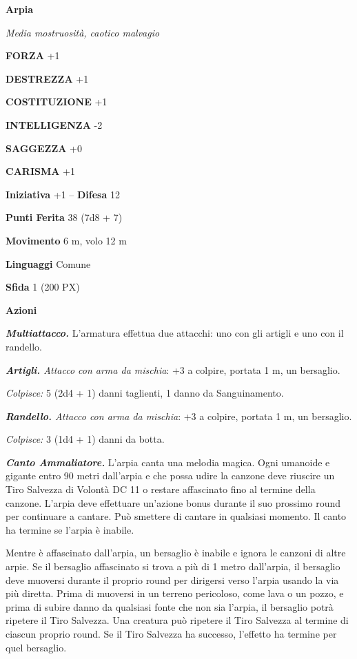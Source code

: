 \begin{multicols}{2}
	\medskip{}\textbf{Arpia}

	\textit{Media mostruosità, caotico malvagio}

	\textbf{FORZA} +1

	\textbf{DESTREZZA} +1

	\textbf{COSTITUZIONE} +1

	\textbf{INTELLIGENZA} -2

	\textbf{SAGGEZZA} +0

	\textbf{CARISMA} +1

	\textbf{Iniziativa} +1 -- \textbf{Difesa} 12

	\textbf{Punti Ferita} 38 (7d8 + 7)

	\textbf{Movimento} 6 m, volo 12 m

	\textbf{Linguaggi} Comune

	\textbf{Sfida} 1 (200 PX)

	\textbf{Azioni}

	\textit{\textbf{Multiattacco.}} L'armatura effettua due attacchi: uno con gli artigli e uno con il randello.

	\textit{\textbf{Artigli.} Attacco con arma da mischia}: +3 a colpire, portata 1 m, un bersaglio.

	\textit{Colpisce:} 5 (2d4 + 1) danni taglienti, 1 danno da Sanguinamento.

	\textit{\textbf{Randello.} Attacco con arma da mischia}: +3 a colpire, portata 1 m, un bersaglio.

	\textit{Colpisce:} 3 (1d4 + 1) danni da botta.

	\textit{\textbf{Canto Ammaliatore.}} L'arpia canta una melodia magica. Ogni umanoide e gigante entro 90 metri dall'arpia e che possa udire la canzone deve riuscire un Tiro Salvezza di Volontà DC 11 o restare affascinato fino al termine della canzone. L'arpia deve effettuare un'azione bonus durante il suo prossimo round per continuare a cantare. Può smettere di cantare in qualsiasi momento. Il canto ha termine se l'arpia è inabile.

	Mentre è affascinato dall'arpia, un bersaglio è inabile e ignora le canzoni di altre arpie. Se il bersaglio affascinato si trova a più di 1 metro dall'arpia, il bersaglio deve muoversi durante il proprio round per dirigersi verso l'arpia usando la via più diretta. Prima di muoversi in un terreno pericoloso, come lava o un pozzo, e prima di subire danno da qualsiasi fonte che non sia l'arpia, il bersaglio potrà ripetere il Tiro Salvezza. Una creatura può ripetere il Tiro Salvezza al termine di ciascun proprio round. Se il Tiro Salvezza ha successo, l'effetto ha termine per quel bersaglio.


\end{multicols}
